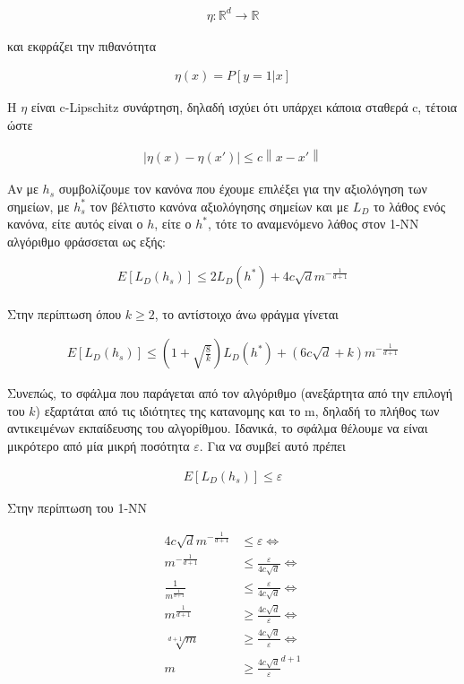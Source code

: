 \documentclass[12pt]{article}
\newcommand{\R}{\mathbb{R}}
\newcommand{\norm}[1]{\left\lVert#1\right\rVert}
\begin{document}
\begin{align*}
	η: \R^d \rightarrow \R
\end{align*}

και εκφράζει την πιθανότητα

\begin{align*}
	η(x) = P[y = 1 | x]
\end{align*}

Η \(η\) είναι c-Lipschitz συνάρτηση, δηλαδή ισχύει ότι υπάρχει κάποια σταθερά c, τέτοια ώστε

\begin{align*}
	|η(x) - η(x')| \leq c \norm{x-x'}
\end{align*}

Αν με \(h_s\) συμβολίζουμε τον κανόνα που έχουμε επιλέξει για την αξιολόγηση των σημείων, με \(h_{s}^*\) τον βέλτιστο κανόνα αξιολόγησης σημείων και με \(L_D\) το λάθος ενός κανόνα, είτε αυτός είναι ο \(h\), είτε ο \(h^*\), τότε το αναμενόμενο λάθος στον 1-NN αλγόριθμο φράσσεται ως εξής:

\begin{align*}
	E[L_D(h_s)] \leq 2 L_D(h^*) + 4c \sqrt{d} m^{- \frac{1}{d+1}}
\end{align*}

Στην περίπτωση όπου \(k \geq 2\), το αντίστοιχο άνω φράγμα γίνεται

\begin{align*}
	E[L_D(h_s)] \leq (1 + \sqrt{\frac{8}{k}}) L_D(h^*) + (6c \sqrt{d} + k) m^{- \frac{1}{d+1}}
\end{align*}

Συνεπώς, το σφάλμα που παράγεται από τον αλγόριθμο (ανεξάρτητα από την επιλογή του \(k\)) εξαρτάται από τις ιδιότητες της κατανομης και το m, δηλαδή το πλήθος των αντικειμένων εκπαίδευσης του αλγορίθμου. Ιδανικά, το σφάλμα θέλουμε να είναι μικρότερο από μία μικρή ποσότητα \(ε\). Για να συμβεί αυτό πρέπει

\begin{align*}
	E[L_D(h_s)] \leq ε
\end{align*}

Στην περίπτωση του 1-ΝΝ

\begin{align*}
	4c \sqrt{d} m^{- \frac{1}{d+1}} &\leq ε \Leftrightarrow \\
	m^{- \frac{1}{d+1}} &\leq \frac{ε}{4c \sqrt{d}} \Leftrightarrow \\
	\frac{1}{m^{\frac{1}{d+1}}} &\leq \frac{ε}{4c \sqrt{d}} \Leftrightarrow \\
	m^{\frac{1}{d+1}} &\geq \frac{4c \sqrt{d} }{ε}\Leftrightarrow \\
	\sqrt[d+1]{m} &\geq \frac{4c \sqrt{d} }{ε} \Leftrightarrow \\
	m &\geq \frac{4c \sqrt{d}}{ε}^{d+1}
\end{align*}
\end{document}
